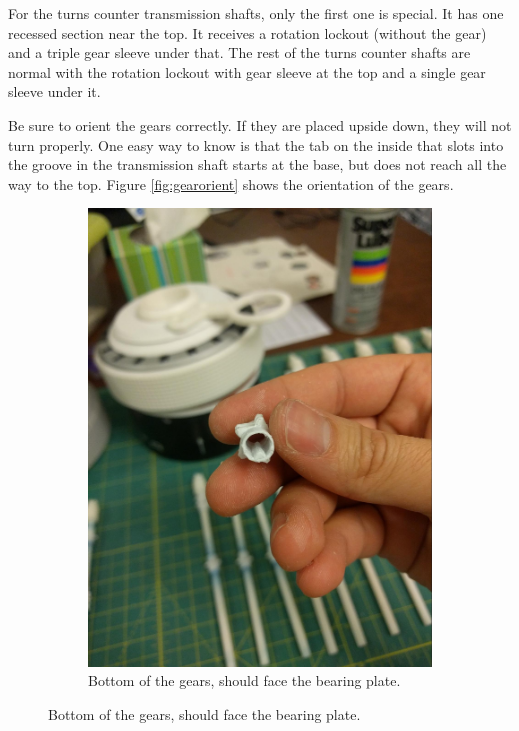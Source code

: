 \documentclass[openany]{book}
\begin{document}
For the turns counter transmission shafts, only the first one is special. It has one recessed section near the top. It receives a rotation lockout (without the gear) and a triple gear sleeve under that. The rest of the turns counter shafts are normal with the rotation lockout with gear sleeve at the top and a single gear sleeve under it. 

Be sure to orient the gears correctly. If they are placed upside down, they will not turn properly. One easy way to know is that the tab on the inside that slots into the groove in the transmission shaft starts at the base, but does not reach all the way to the top. Figure \ref{fig:gearorient} shows the orientation of the gears.

\begin{figure}[!ht]
	\centering
	\begin{subfigure}{.46\textwidth}
		\centering
		\includegraphics[width=.95\textwidth]{images/image56.jpg}
		\caption{Bottom of the gears, should face the bearing plate.}
		\label{fig:image56}	
	\end{subfigure}

\end{figure}
\end{document}
